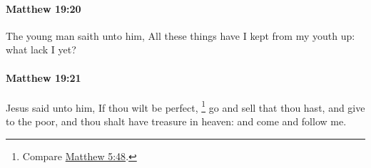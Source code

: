 		\paragraph{Matthew 19:20} %
			\label{MATTHEW-19-20}

			The young man saith unto him, All these things have I kept from my youth up: what lack I yet?

			\begin{framed}
			\scriptsize
				\begin{compactdesc}
					\item[SBLG] 
				\end{compactdesc}
			\end{framed}

		\paragraph{Matthew 19:21} %
			\label{MATTHEW-19-21}

			Jesus said unto him, If thou wilt be perfect,%
				\footnote{%
					Compare \hyperref[MATTHEW-5-48]{Matthew 5:48}.
					}
			go and sell that thou hast, and give to the poor, and thou shalt have treasure in heaven: and come and follow me.

